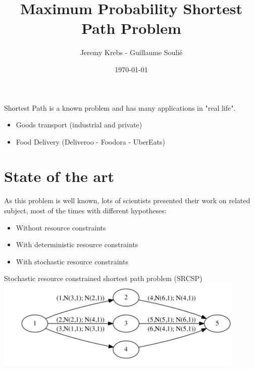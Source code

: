 \documentclass{beamer}
\title{Maximum Probability Shortest Path Problem}
\author{Jeremy Krebs - Guillaume Soulié}
\institute{Université Paris Saclay}
\date{\today}
\begin{document}
\begin{frame}
\titlepage
\end{frame}

\begin{frame}
  \tableofcontents
\end{frame}      

\begin{frame}
Shortest Path is a known problem and has many applications in "real life".

\begin{itemize}
	\item Goods transport (industrial and private)
	\item Food Delivery (Deliveroo - Foodora - UberEats)
\end{itemize}

\end{frame}

\section{State of the art}

\begin{frame}

As this problem is well known, lots of scientists presented their work on related subject, most of the times with different hypotheses:

\begin{itemize}
	\item<2-> Without resource constraints
	\item<3-> With deterministic resource constraints
	\item<4-> With stochastic resource constraints
\end{itemize}

\end{frame}

\begin{frame}
	Stochastic resource constrained shortest path problem (SRCSP)
	\hspace*{-1.5cm}
	\includegraphics[width=12cm]{media/SRCSP_2.png}
\end{frame}
\end{document}
